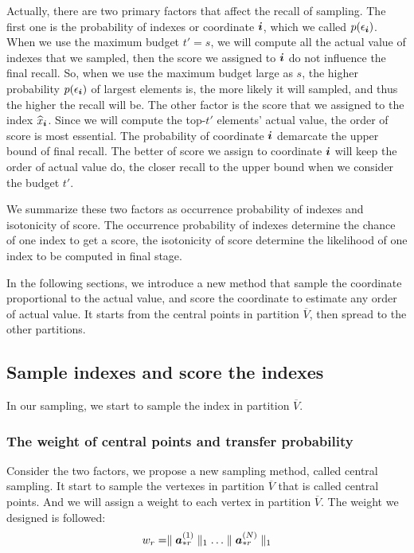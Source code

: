 \documentclass{article}
\newcommand{\V}[1]{{\bm{{\MakeLowercase{#1}}}}}
\newcommand{\Vacol}[1]{\V{a}^{(#1)}_{*r}}
\newcommand{\norm}[2]{\parallel#1\parallel_{#2}}
\begin{document}
Actually, there are two primary factors that affect the recall of sampling. The first one is the probability of indexes or coordinate $\V{i}$, which we called $p(\epsilon_{\V{i}})$. When we use the maximum budget $t'=s$, we will compute all the actual value of indexes that we sampled, then the score we assigned to $\V{i}$ do not influence the final recall. So, when we use the maximum budget large as $s$, the higher probability $p(\epsilon_{\V{i}})$ of largest elements is, the more likely it will sampled, and thus the higher the recall will be. The other factor is the score that we assigned to the index $\widehat{x}_{\V{i}}$. Since we will compute the top-$t'$ elements' actual value, the order of score is most essential. The probability of coordinate $\V{i}$ demarcate the upper bound of final recall. The better of score we assign to coordinate $\V{i}$ will keep the order of actual value do, the closer recall to the upper bound when we consider the budget $t'$.

We summarize these two factors as occurrence probability of indexes and isotonicity of score. The occurrence probability of indexes determine the chance of one index to get a score, the isotonicity of score determine the likelihood of one index to be computed in final stage.

In the following sections, we introduce a new method that sample the coordinate proportional to the actual value, and score the coordinate to estimate any order of actual value. It starts from the central points in partition $\overline{V}$, then spread to the other partitions.

\subsection{Sample indexes and score the indexes}

In our sampling, we start to sample the index in partition $\overline{V}$.

\subsubsection{The weight of central points and transfer probability}

Consider the two factors, we propose a new sampling method, called central sampling. It start to sample the vertexes in partition $\overline{V}$ that is called central points. And we will assign a weight to each vertex in partition $\overline{V}$. The weight we designed is followed:
\[
    w_r = \norm{\Vacol{1}}{1}\ldots\norm{\Vacol{N}}{1}
\]
\end{document}
